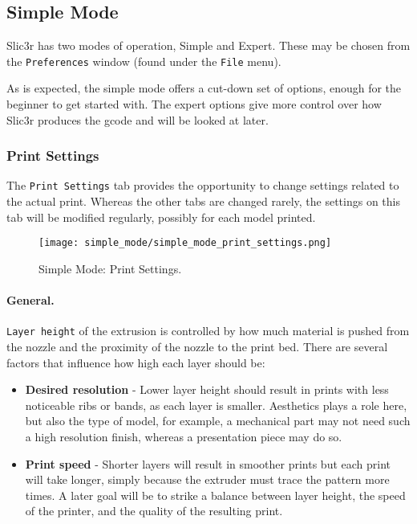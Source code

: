 
\subsection{Simple Mode}
Slic3r has two modes of operation, Simple and Expert. These may be chosen from the \texttt{Preferences} window (found under the \texttt{File} menu).  

\setlength\fboxsep{10pt}
\setlength\fboxrule{0pt}
\noindent
\centerline{}

As is expected, the simple mode offers a cut-down set of options, enough for the beginner to get started with.  The expert options give more control over how Slic3r produces the gcode and will be looked at later.

\subsubsection{Print Settings}

The \texttt{Print Settings} tab provides the opportunity to change settings related to the actual print.  Whereas the other tabs are changed rarely, the settings on this tab will be modified regularly, possibly for each model printed.

\begin{figure}[ht]
\centering
\texttt{[image: simple\_mode/simple\_mode\_print\_settings.png]}
\caption{Simple Mode: Print Settings.}
\label{fig:simple_mode_print_settings}
\end{figure}

\paragraph{General.} %
\label{par:simple_general}

\texttt{Layer height} of the extrusion is controlled by how much material is pushed from the nozzle and the proximity of the nozzle to the print bed.  There are several factors that influence how high each layer should be:
\begin{itemize}
	\item \textbf{Desired resolution}  - Lower layer height should result in prints with less noticeable ribs or bands, as each layer is smaller.  Aesthetics plays a role here, but also the type of model, for example, a mechanical part may not need such a high resolution finish, whereas a presentation piece may do so.
	\item \textbf{Print speed}  - Shorter layers will result in smoother prints but each print will take longer, simply because the extruder must trace the pattern more times.  A later goal will be to strike a balance between layer height, the speed of the printer, and the quality of the resulting print.
\end{itemize} 

